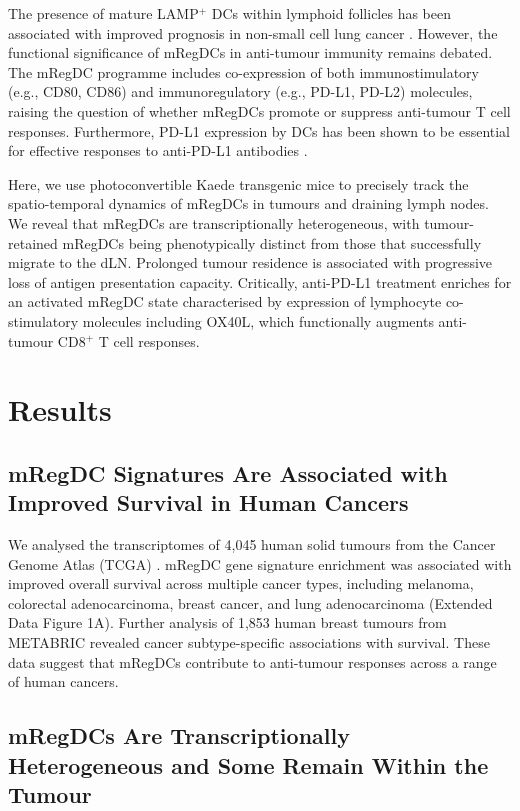 \documentclass[11pt]{article}
\begin{document}
The presence of mature LAMP$^+$ DCs within lymphoid follicles has been associated with improved prognosis in non-small cell lung cancer \citep{DeCastro2012,Dieu-Nosjean2008,Goc2014}. However, the functional significance of mRegDCs in anti-tumour immunity remains debated. The mRegDC programme includes co-expression of both immunostimulatory (e.g., CD80, CD86) and immunoregulatory (e.g., PD-L1, PD-L2) molecules, raising the question of whether mRegDCs promote or suppress anti-tumour T cell responses. Furthermore, PD-L1 expression by DCs has been shown to be essential for effective responses to anti-PD-L1 antibodies \citep{Oh2020,Peng2020}.

Here, we use photoconvertible Kaede transgenic mice to precisely track the spatio-temporal dynamics of mRegDCs in tumours and draining lymph nodes. We reveal that mRegDCs are transcriptionally heterogeneous, with tumour-retained mRegDCs being phenotypically distinct from those that successfully migrate to the dLN. Prolonged tumour residence is associated with progressive loss of antigen presentation capacity. Critically, anti-PD-L1 treatment enriches for an activated mRegDC state characterised by expression of lymphocyte co-stimulatory molecules including OX40L, which functionally augments anti-tumour CD8$^+$ T cell responses.

\section{Results}

\subsection{mRegDC Signatures Are Associated with Improved Survival in Human Cancers}

We analysed the transcriptomes of 4,045 human solid tumours from the Cancer Genome Atlas (TCGA) \citep{TCGA2013}. mRegDC gene signature enrichment was associated with improved overall survival across multiple cancer types, including melanoma, colorectal adenocarcinoma, breast cancer, and lung adenocarcinoma (Extended Data Figure 1A). Further analysis of 1,853 human breast tumours from METABRIC revealed cancer subtype-specific associations with survival. These data suggest that mRegDCs contribute to anti-tumour responses across a range of human cancers.

\subsection{mRegDCs Are Transcriptionally Heterogeneous and Some Remain Within the Tumour}
\end{document}
